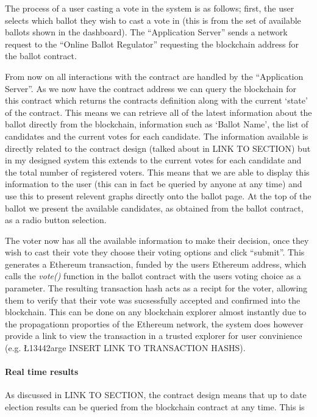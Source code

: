 \documentclass{article}
\begin{document}
The process of a user casting a vote in the system is as follows; first, the user selects which ballot they wish to cast a vote in (this is from the set of available ballots shown in the dashboard). The ``Application Server'' sends a network request to the ``Online Ballot Regulator'' requesting the blockchain address for the ballot contract.

From now on all interactions with the contract are handled by the ``Application Server''. As we now have the contract address we can query the blockchain for this contract which returns the contracts definition along with the current `state' of the contract. This means we can retrieve all of the latest information about the ballot directly from the blockchain, information such as `Ballot Name', the list of candidates and the current votes for each candidate. The information available is directly related to the contract design (talked about in {\Large LINK TO SECTION}) but in my designed system this extends to the current votes for each candidate and the total number of registered voters. This means that we are able to display this information to the user (this can in fact be queried by anyone at any time) and use this to present relevent graphs directly onto the ballot page. At the top of the ballot we present the available candidates, as obtained from the ballot contract, as a radio button selection.

The voter now has all the available information to make their decision, once they wish to cast their vote they choose their voting options and click ``submit''. This generates a Ethereum transaction, funded by the users Ethereum address, which calls the \textit{vote()} function in the ballot contract with the users voting choice as a parameter. The resulting transaction hash acts as a recipt for the voter, allowing them to verify that their vote was sucsessfully accepted and confirmed into the blockchain. This can be done on any blockchain explorer almost instantly due to the propagationn proporties of the Ethereum network, the system does however provide a link to view the transaction in a trusted explorer for user convinience (e.g. {\L13442arge INSERT LINK TO TRANSACTION HASHS}).

\paragraph{Real time results}
\hfill \break
As discussed in {\Large LINK TO SECTION}, the contract design means that up to date election results can be queried from the blockchain contract at any time. This is
\end{document}
